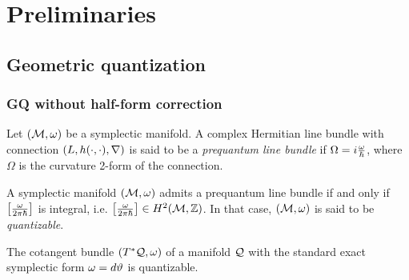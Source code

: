 \documentclass[notas.tex]{subfiles} 				%
\begin{document}
\section{Preliminaries} \label{sec_prelim}

\subsection{Geometric quantization} \label{sec_gq}

\subsubsection{GQ without half-form correction} \label{sec_gq_without_hf}

\begin{defn}
	Let $(\mathcal{M}, \omega)$ be a symplectic manifold. A complex Hermitian line bundle with connection $(L, h(\cdot,\cdot), \nabla)$ is said to be a \emph{prequantum line bundle} if $\Omega = i\frac{\omega}{\hbar}$, where $\Omega$ is the curvature 2-form of the connection.
\end{defn}
\begin{thm} \label{thm_quantizable_mfld}
	A symplectic manifold $(\mathcal{M}, \omega)$ admits a prequantum line bundle if and only if $\left[ \frac{\omega}{2\pi \hbar} \right]$ is integral, i.e. $\left[  \frac{\omega}{2\pi\hbar} \right] \in H^2(\mathcal{M}, \mathbb{Z})$. In that case, $(\mathcal{M},\omega)$ is said to be \emph{quantizable}.
\end{thm}

\begin{ex}
	The cotangent bundle $(T^*\mathcal{Q}, \omega)$ of a manifold $\mathcal{Q}$ with the standard exact symplectic form $\omega = d \vartheta$ is quantizable.
\end{ex}
\end{document}

